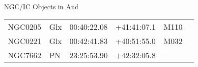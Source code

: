 \begin{block}{NGC/IC Objects in And}
  \centering
  \begin{tabularx}{\textwidth}{llrrll} 
    NGC0205 & Glx & 00:40:22.08 & +41:41:07.1  & M110 \\ 
    NGC0221 & Glx & 00:42:41.83 & +40:51:55.0  & M032 \\ 
    NGC7662 & PN & 23:25:53.90 & +42:32:05.8  & -- \\ 
  \end{tabularx}
\end{block}